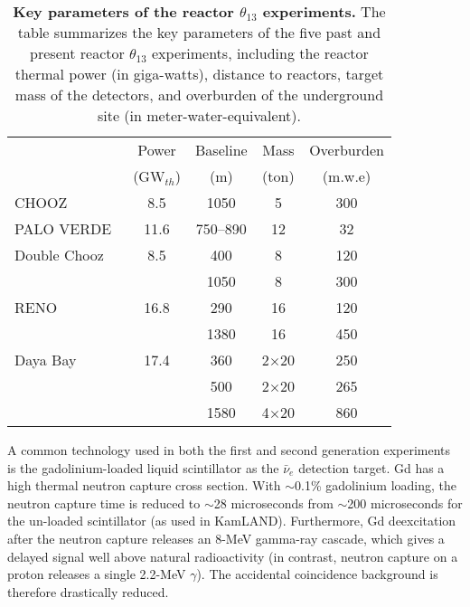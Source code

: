 \documentclass[aps,twocolumn,preprintnumbers,amsmath,superscriptaddress,amssymb,floats,nofootinbib]{revtex4-1}
\begin{document}
\begin{table}[tb]
  \begin{tabular}{lcccc}
  \hline
  & Power & Baseline & Mass & Overburden \\
  & (GW$_{th}$) & (m) & (ton) & (m.w.e)    \\
  \hline
  CHOOZ~\cite{Chooz}            & 8.5  & 1050  & 5    & 300\\
  PALO VERDE~\cite{Paloverde}   & 11.6 & 750--890  & 12  & 32\\
  \hline
  Double Chooz~\cite{DChooz}    & 8.5  & 400  & 8  & 120\\
                                &      & 1050 & 8  & 300\\
  RENO~\cite{Reno}              & 16.8 & 290  & 16   & 120\\
                                &      & 1380 & 16   & 450\\
  Daya Bay~\cite{Dayabay}       & 17.4 & 360  & 2$\times$20   & 250\\
                                &      & 500  & 2$\times$20   & 265\\
                                &      & 1580 & 4$\times$20   & 860\\
  \hline
  \end{tabular}
  \caption{{\bf Key parameters of the reactor $\theta_{13}$ experiments.} The table summarizes the key parameters of the five past and present reactor $\theta_{13}$ experiments, including the reactor thermal power (in giga-watts), distance to reactors, target mass of the detectors, and overburden of the underground site (in meter-water-equivalent).}
\label{tab:theta13}
\end{table}

A common technology used in both the first and second generation experiments is the gadolinium-loaded liquid scintillator as the $\bar\nu_{e}$ detection target. 
Gd has a high thermal neutron capture cross section. With $\sim$0.1\% gadolinium loading, the neutron capture time is reduced to $\sim$28 microseconds from $\sim$200 microseconds for the un-loaded scintillator (as used in KamLAND). 
Furthermore, Gd deexcitation after the neutron capture releases an 8-MeV gamma-ray cascade, which gives a delayed signal well above natural radioactivity (in contrast, 
neutron capture on a proton releases a single 2.2-MeV $\gamma$). The accidental coincidence background is therefore drastically reduced.
\end{document}
